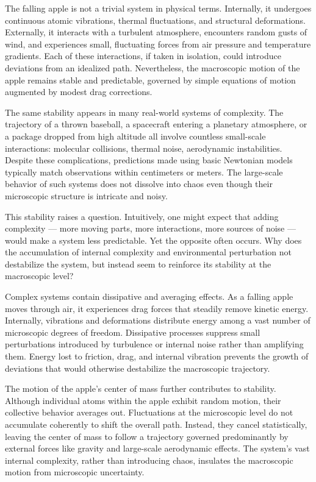 The falling apple is not a trivial system in physical terms. Internally, it undergoes continuous atomic vibrations, thermal fluctuations, and structural deformations. Externally, it interacts with a turbulent atmosphere, encounters random gusts of wind, and experiences small, fluctuating forces from air pressure and temperature gradients. Each of these interactions, if taken in isolation, could introduce deviations from an idealized path. Nevertheless, the macroscopic motion of the apple remains stable and predictable, governed by simple equations of motion augmented by modest drag corrections.

The same stability appears in many real-world systems of complexity. The trajectory of a thrown baseball, a spacecraft entering a planetary atmosphere, or a package dropped from high altitude all involve countless small-scale interactions: molecular collisions, thermal noise, aerodynamic instabilities. Despite these complications, predictions made using basic Newtonian models typically match observations within centimeters or meters. The large-scale behavior of such systems does not dissolve into chaos even though their microscopic structure is intricate and noisy.

This stability raises a question. Intuitively, one might expect that adding complexity — more moving parts, more interactions, more sources of noise — would make a system less predictable. Yet the opposite often occurs. Why does the accumulation of internal complexity and environmental perturbation not destabilize the system, but instead seem to reinforce its stability at the macroscopic level?

Complex systems contain dissipative and averaging effects. As a falling apple moves through air, it experiences drag forces that steadily remove kinetic energy. Internally, vibrations and deformations distribute energy among a vast number of microscopic degrees of freedom. Dissipative processes suppress small perturbations introduced by turbulence or internal noise rather than amplifying them. Energy lost to friction, drag, and internal vibration prevents the growth of deviations that would otherwise destabilize the macroscopic trajectory.

The motion of the apple’s center of mass further contributes to stability. Although individual atoms within the apple exhibit random motion, their collective behavior averages out. Fluctuations at the microscopic level do not accumulate coherently to shift the overall path. Instead, they cancel statistically, leaving the center of mass to follow a trajectory governed predominantly by external forces like gravity and large-scale aerodynamic effects. The system's vast internal complexity, rather than introducing chaos, insulates the macroscopic motion from microscopic uncertainty.

